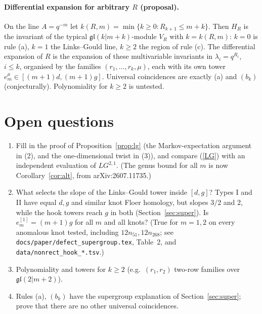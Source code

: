 \documentclass[11pt]{article}
\theoremstyle{definition}
\theoremstyle{remark}
\begin{document}
\paragraph{Differential expansion for arbitrary $R$ (proposal).}  On the line $A=q^{-m}$ let
$k(R,m)=\min\{k\ge0:R_{k+1}\le m+k\}$.  Then $H_R$ is the invariant of the typical $\mathfrak{gl}(k|m+k)$-module
$V_R$ with $k=k(R,m)$: $k=0$ is rule (a), $k=1$ the Links--Gould line, $k\ge2$ the region of rule (c).  The
differential expansion of $R$ is the expansion of these multivariable invariants in $\lambda_i=q^{R_i}$,
$i\le k$, organised by the families $(r_1,\dots,r_k,\mu)$, each with its own tower $e^\mu_m\in[(m+1)d,(m+1)g]$.
Universal coincidences are exactly (a) and $(b_k)$ (conjecturally).  Polynomiality for $k\ge2$ is untested.

\section{Open questions}
\begin{enumerate}
\item Fill in the proof of Proposition~\ref{prop:lg} (the Markov-expectation argument in (2), and the
one-dimensional twist in (3)), and compare (\ref{LG}) with an independent evaluation of $LG^{2,1}$.
(The genus bound for all $m$ is now Corollary~\ref{cor:alt}, from arXiv:2607.11735.)
\item What selects the slope of the Links--Gould tower inside $[d,g]$?  Types I and II have equal $d,g$ and similar
knot Floer homology, but slopes $3/2$ and $2$, while the hook towers reach $g$ in both (Section~\ref{sec:super}).
Is $e^{[1]}_m=(m+1)g$ for all $m$ and all knots?  (True for $m=1,2$ on every anomalous knot tested, including $12n_{51},12n_{268}$; see \texttt{docs/paper/defect\_supergroup.tex}, Table~2, and \texttt{data/nonrect\_hook\_*.tsv}.)
\item Polynomiality and towers for $k\ge2$ (e.g.\ $(r_1,r_2)$ two-row families over $\mathfrak{gl}(2|m+2)$).
\item Rules (a), $(b_k)$ have the supergroup explanation of Section~\ref{sec:super}; prove that there are no other
universal coincidences.
\end{enumerate}
\end{document}
